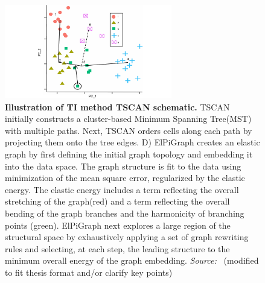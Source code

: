 \begin{description}
    \begin{figure}[ht!]
    	\centering
    	\includegraphics[width=0.65\textwidth]{TI_Alg_TSCAN/fig}
    	\vspace{0.1cm}
    	\caption[Illustration of TI method TSCAN schematic.]{\textbf{Illustration of TI method TSCAN schematic.}
    	TSCAN initially constructs a cluster-based Minimum Spanning Tree(MST) with multiple paths. Next, TSCAN orders cells along each path by projecting them onto the tree edges.
    	D) ElPiGraph creates an elastic graph by first defining the initial graph topology and embedding it into the data space. The graph structure is fit to the data using minimization of the mean square error, regularized by the elastic energy. The elastic energy includes a term reflecting the overall stretching of the graph(red) and a term reflecting the overall bending of the graph branches and the harmonicity of branching points (green). ElPiGraph next explores a large region of the structural space by exhaustively applying a set of graph rewriting rules and selecting, at each step, the leading structure to the minimum overall energy of the graph embedding. \emph{Source:~\cite{ji2016tscan}} (modified to fit thesis format and/or clarify key points)
    	}
    	\label{fig:TI_Alg_TSCAN}
    \end{figure}
\end{description}

